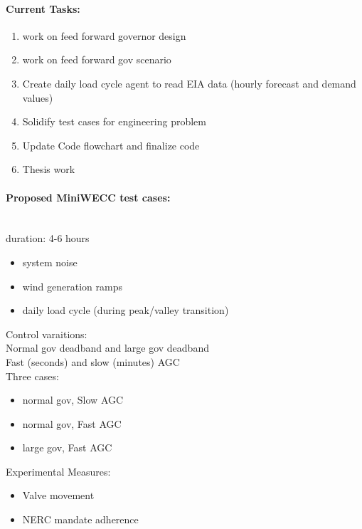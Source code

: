\documentclass[12pt]{article}
\begin{document}
\begin{multicols}{2}
\begin{enumerate}
\vfill\null
\columnbreak
	
	\end{enumerate}
\paragraph{Current Tasks:}
	\begin{enumerate}
		\itemsep0em 
		\item work on feed forward governor design
		\item work on feed forward gov scenario
\item Create daily load cycle agent to read EIA data (hourly forecast and demand values)
		\item Solidify test cases for engineering problem
		\item Update Code flowchart and finalize code%
		\item Thesis work 
\end{enumerate}
\paragraph{Proposed MiniWECC test cases:} \ \\
duration: 4-6 hours
\begin{itemize}
	\itemsep0em 
\item system noise 
\item wind generation ramps 
\item daily load cycle (during peak/valley transition)
\end{itemize}

Control varaitions:\\
Normal gov deadband and large gov deadband \\
Fast (seconds) and slow (minutes) AGC
\\ Three cases: 
\begin{itemize}
	\itemsep0em 
\item normal gov, Slow AGC
\item normal gov, Fast AGC
\item large gov, Fast AGC
\end{itemize}

Experimental Measures:
\begin{itemize}
\itemsep 0em
\item Valve movement
\item NERC mandate adherence
\end{itemize}

		

\end{multicols}
\end{document}

